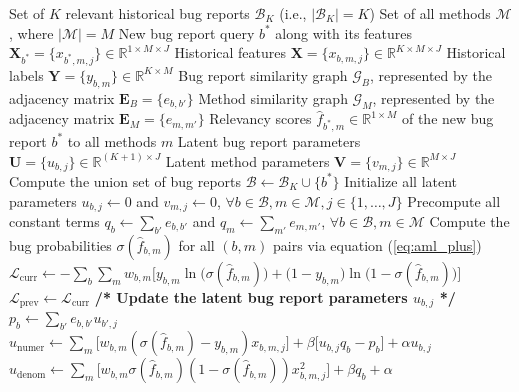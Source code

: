 \begin{algorithm*}[!ht]
	\begin{algorithmic}[1]
		\Require
		    \Statex Set of $K$ relevant historical bug reports $\mathcal{B}_K$ (i.e.,  $|\mathcal{B}_K| = K$)
			\Statex Set of all methods $\mathcal{M}$, where $|\mathcal{M}| = M$
		    \Statex New bug report query $b^*$ along with its features $\mathbf{X}_{b^*} = \{ x_{b^*,m,j} \} \in \mathbb{R}^{1 \times M \times J}$
			\Statex Historical features $\mathbf{X} = \{ x_{b,m,j} \} \in \mathbb{R}^{K \times M \times J}$
			\Statex Historical labels $\mathbf{Y} = \{ y_{b,m} \} \in \mathbb{R}^{K \times M}$
			\Statex Bug report similarity graph $\mathcal{G}_B$, represented by the adjacency matrix $\mathbf{E}_B = \{ e_{b,b'} \}$
			\Statex Method similarity graph $\mathcal{G}_M$, represented by the adjacency matrix $\mathbf{E}_M = \{ e_{m,m'} \}$
		\Ensure 
		    \Statex Relevancy scores $\hat{f}_{b^*,m} \in \mathbb{R}^{1 \times M}$ of the new bug report $b^*$ to all methods $m$
			\Statex Latent bug report parameters $\mathbf{U} = \{ u_{b,j} \} \in \mathbb{R}^{(K + 1) \times J}$ 
			\Statex Latent method parameters $\mathbf{V} = \{ v_{m,j} \} \in \mathbb{R}^{M \times J}$ 
		\Statex \hrulefill
		\State Compute the union set of bug reports $\mathcal{B} \leftarrow \mathcal{B}_K \cup \{ b^* \}$
		\State Initialize all latent parameters $u_{b,j} \leftarrow 0$ and $v_{m,j} \leftarrow 0$, $\forall b \in \mathcal{B}, m \in \mathcal{M}, j \in \{ 1,\ldots,J \}$
		\State Precompute all constant terms $q_b \leftarrow \sum_{b'} e_{b,b'}$ and $q_m \leftarrow \sum_{m'} e_{m,m'}$, $\forall b \in \mathcal{B}, m \in \mathcal{M}$
		\State Compute the bug probabilities $\sigma(\hat{f}_{b,m})$ for all $(b,m)$ pairs via equation (\ref{eq:aml_plus})
		\State $\mathcal{L}_\text{curr} \leftarrow -\sum_{b} \sum_{m} w_{b,m} \big[ y_{b,m} \ln \big( \sigma(\hat{f}_{b,m}) \big) + \big( 1 - y_{b,m} \big) \ln \big(1 - \sigma(\hat{f}_{b,m}) \big) \big]$
		\Repeat 
		\State $\mathcal{L}_\text{prev} \leftarrow \mathcal{L}_\text{curr}$
		\State \textbf{/* Update the latent bug report parameters $u_{b,j}$ */}
		\State $p_{b} \leftarrow \sum_{b'} e_{b,b'} u_{b',j}$
		\EndFor
		\State $u_\text{numer} \leftarrow \sum_m \big[ w_{b,m} (\sigma(\hat{f}_{b,m}) - y_{b,m}) x_{b,m,j} \big] + \beta \big[ u_{b,j} q_b - p_{b} \big] + \alpha u_{b,j}$
		\State $u_\text{denom} \leftarrow \sum_m \big[ w_{b,m} \sigma(\hat{f}_{b,m}) (1 - \sigma(\hat{f}_{b,m})) x_{b,m,j}^2 \big] + \beta q_b + \alpha$

\end{algorithmic}
\end{algorithm*}
